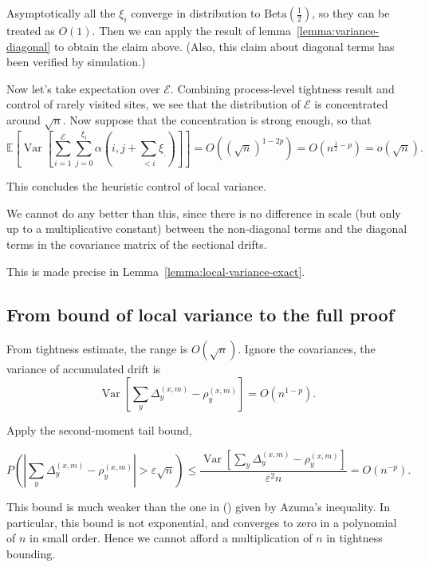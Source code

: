 Asymptotically all the $\xi_i$ converge in distribution to $\text{Beta}(\frac{1}{2})$, so they can be treated as $O(1)$. Then we can apply the result of lemma~\ref{lemma:variance-diagonal} to obtain the claim above. (Also, this claim about diagonal terms has been verified by simulation.)

Now let's take expectation over $\mathcal{E}$. Combining process-level tightness result and control of rarely visited sites, we see that the distribution of $\mathcal{E}$ is concentrated around $\sqrt{n} $. Now suppose that the concentration is strong enough, so that
\[
	\mathbb{E}\left[ \operatorname{Var} \left[ \sum_{i = 1}^\mathcal{E} \sum_{j = 0}^{\xi_i} \alpha(i, j + \sum_{< i} \xi_.) \right]  \right] 
	= O\left( (\sqrt{n} )^{1-2p} \right)  = O(n^{\frac{1}{2}-p}) = o(\sqrt{n} )
.\] 

This concludes the heuristic control of local variance.

\begin{remark}
	We cannot do any better than this, since there is no difference in scale (but only up to a multiplicative constant) between the non-diagonal terms and the diagonal terms in the covariance matrix of the sectional drifts. 

	This is made precise in Lemma~\ref{lemma:local-variance-exact}.
\end{remark}

\subsection{From bound of local variance to the full proof}

From tightness estimate, the range is $O(\sqrt{n})$. Ignore the covariances, the variance of accumulated drift is
 \[
	 \operatorname{Var} \left[ \sum_y \Delta_y^{(x,m)} - \rho_y^{(x,m)} \right]  = O(n^{1 - p})
.\] 

Apply the second-moment tail bound,

\[
	P\left( \left| \sum_{y} \Delta_y^{(x,m)} - \rho_y^{(x,m)} \right| > \varepsilon\sqrt{n}  \right)
	\le  \frac{\operatorname{Var} \left[ \sum_{y} \Delta_y^{(x,m)} - \rho_y^{(x,m)}\right] }{\varepsilon^2 n}
	= O( n^{-p})
.\] 

This bound is much weaker than the one in (\cite{kosyginaFunctionalLimitLaws2016}) given by Azuma's inequality. In particular, this bound is not exponential, and converges to zero in a polynomial of $n$ in small order. Hence we cannot afford a multiplication of $n$ in tightness bounding.

